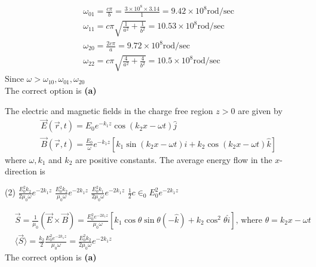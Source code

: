 \begin{enumerate}
\begin{answer}
$$\begin{aligned}
	&\omega_{01}=\frac{c \pi}{b}=\frac{3 \times 10^{8} \times 3.14}{1}=9.42 \times 10^{8} \mathrm{rod} / \mathrm{sec} \\
	&\omega_{11}=c \pi \sqrt{\frac{1}{a^{2}}+\frac{1}{b^{2}}}=10.53 \times 10^{8} \mathrm{rod} / \mathrm{sec} \\
	&\omega_{20}=\frac{2 c \pi}{a}=9.72 \times 10^{8} \mathrm{rod} / \mathrm{sec} \\
	&\omega_{22}=c \pi \sqrt{\frac{4}{a^{2}}+\frac{4}{b^{2}}}=10.5 \times 10^{8} \mathrm{rod} / \mathrm{sec}
	\end{aligned}
	$$
	Since $\omega>\omega_{10}, \omega_{01}, \omega_{20}$\\
	The correct option is \textbf{(a)}	
\end{answer}
\begin{minipage}{\textwidth}
	\item The electric and magnetic fields in the charge free region $z>0$ are given by
	$$
	\begin{aligned}
	&\vec{E}(\vec{r}, t)=E_{0} e^{-k_{1} z} \cos \left(k_{2} x-\omega t\right) \hat{j} \\
	&\vec{B}(\vec{r}, t)=\frac{E_{0}}{\omega} e^{-k_{1} z}\left[k_{1} \sin \left(k_{2} x-\omega t\right) \hat{i}+k_{2} \cos \left(k_{2} x-\omega t\right) \hat{k}\right]
	\end{aligned}
	$$
	where $\omega, k_{1}$ and $k_{2}$ are positive constants. The average energy flow in the $x$-direction is
\end{minipage}
\begin{tasks}(2)
	\task[\textbf{A.}] $\frac{E_{0}^{2} k_{2}}{2 \mu_{0} \omega} e^{-2 k_{1} z}$
	\task[\textbf{B.}]$\frac{E_{0}^{2} k_{2}}{\mu_{0} \omega} e^{-2 k_{1} z}$
	\task[\textbf{C.}]$\frac{E_{0}^{2} k_{1}}{2 \mu_{0} \omega} e^{-2 k_{1} z}$
	\task[\textbf{D.}]$\frac{1}{2} c \in_{0} E_{0}^{2} e^{-2 k_{1} z}$
\end{tasks}
\begin{answer}
	$$	\begin{aligned}
	&\vec{S}=\frac{1}{\mu_{0}}(\vec{E} \times \vec{B})=\frac{E_{0}^{2} e^{-2 k_{1} z}}{\mu_{0} \omega}\left[k_{1} \cos \theta \sin \theta(-\hat{k})+k_{2} \cos ^{2} \theta \hat{i}\right] \text {, where } \theta=k_{2} x-\omega t \\
	&\langle\vec{S}\rangle=\frac{k_{2}}{2} \frac{E_{0}^{2} e^{-2 k_{1} z}}{\mu_{0} \omega}=\frac{E_{0}^{2} k_{2}}{2 \mu_{0} \omega} e^{-2 k_{1} z}
	\end{aligned}$$
	The correct option is \textbf{(a)}

\end{answer}
\end{enumerate}
